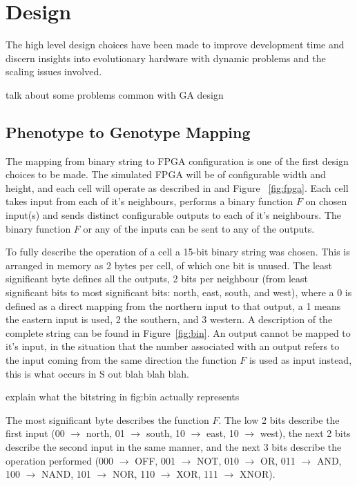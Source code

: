 \section{Design}
The high level design choices have been made to improve development time
and discern insights into evolutionary hardware with dynamic problems and
the scaling issues involved.

\todo talk about some problems common with GA design

\subsection{Phenotype to Genotype Mapping}
The mapping from binary string to FPGA configuration is one of the first design
choices to be made. The simulated FPGA will be of configurable width and height, and each
cell will operate as described in \cite{10.1007/3-540-63173-9_61} and Figure~
\ref{fig:fpga}. Each cell takes
input from each of it's neighbours, performs a binary function $F$ on chosen input(s)
and sends distinct configurable outputs to each of it's neighbours. The binary
function $F$ or any of the inputs can be sent to any of the outputs.

To fully describe the operation of a cell a 15-bit binary string was chosen.
This is arranged in memory as 2 bytes per cell, of which one bit is unused.
The least significant byte defines all the outputs, 2 bits per neighbour
(from least significant bits to most significant bits: north, east, south,
and west), where a 0 is defined as a direct mapping from the northern input
to that output, a 1 means the eastern input is used, 2 the southern, and 3
western.  A description of
the complete string can be found in Figure~\ref{fig:bin}.
An output cannot be mapped to it's input, in the situation that the
number associated with an output refers to the input coming from the same
direction the function $F$ is used as input instead, \todo this is what
occurs in S out blah blah blah.

\todo explain what the bitstring in fig:bin actually represents

The most significant byte describes the function $F$. The low 2 bits describe
the first input (00 $\rightarrow$ north, 01 $\rightarrow$ south, 10
$\rightarrow$ east, 10 $\rightarrow$ west), the next 2 bits describe the second
input in the same manner, and the next 3 bits describe the operation performed
(000 $\rightarrow$ OFF, 001 $\rightarrow$ NOT, 010 $\rightarrow$ OR, 011 $\rightarrow$
AND, 100 $\rightarrow$ NAND, 101 $\rightarrow$ NOR, 110 $\rightarrow$ XOR, 111
$\rightarrow$ XNOR).

